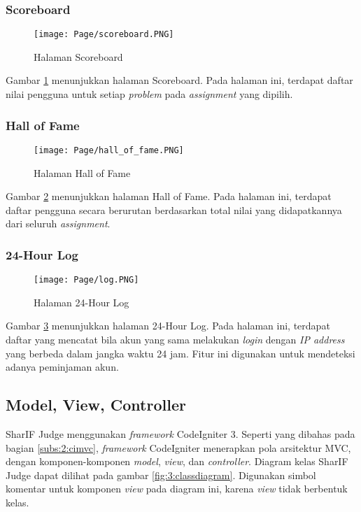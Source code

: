 \subsubsection{Scoreboard}
    \begin{figure}[H]
    	\centering  
    	\texttt{[image: Page/scoreboard.PNG]}  
    	\caption{Halaman Scoreboard}
    	\label{fig:3:scoreboard} 
    \end{figure} 
    
    Gambar \ref{fig:3:scoreboard} menunjukkan halaman Scoreboard. Pada halaman ini, terdapat daftar nilai pengguna untuk setiap \textit{problem} pada \textit{assignment} yang dipilih.
    
\subsubsection{Hall of Fame}
    \begin{figure}[H]
    	\centering  
    	\texttt{[image: Page/hall\_of\_fame.PNG]}  
    	\caption{Halaman Hall of Fame}
    	\label{fig:3:hall_of_fame} 
    \end{figure} 
    
    Gambar \ref{fig:3:hall_of_fame} menunjukkan halaman Hall of Fame. Pada halaman ini, terdapat daftar pengguna secara berurutan berdasarkan total nilai yang didapatkannya dari seluruh \textit{assignment}.

\subsubsection{24-Hour Log}
    \begin{figure}[H]
    	\centering  
    	\texttt{[image: Page/log.PNG]}  
    	\caption{Halaman 24-Hour Log}
    	\label{fig:3:log} 
    \end{figure} 
    
    Gambar \ref{fig:3:log} menunjukkan halaman 24-Hour Log. Pada halaman ini, terdapat daftar yang mencatat bila akun yang sama melakukan \textit{login} dengan \textit{IP address} yang berbeda dalam jangka waktu 24 jam. Fitur ini digunakan untuk mendeteksi adanya peminjaman akun.

\subsection{Model, View, Controller}
\label{subs:3:mvc}
SharIF Judge menggunakan \textit{framework} CodeIgniter 3. Seperti yang dibahas pada bagian \ref{subs:2:cimvc}, \textit{framework} CodeIgniter menerapkan pola arsitektur MVC, dengan komponen-komponen \textit{model}, \textit{view}, dan \textit{controller}. Diagram kelas SharIF Judge dapat dilihat pada gambar \ref{fig:3:classdiagram}. Digunakan simbol komentar untuk komponen \textit{view} pada diagram ini, karena \textit{view} tidak berbentuk kelas.

